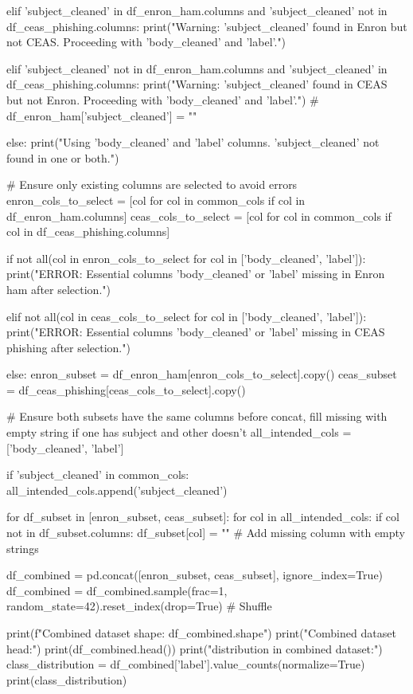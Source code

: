 \begin{ffcode}
    elif 'subject_cleaned' in df_enron_ham.columns and 'subject_cleaned' not in df_ceas_phishing.columns:
        print("Warning: 'subject_cleaned' found in Enron but not CEAS. Proceeding with 'body_cleaned' and 'label'.")

    elif 'subject_cleaned' not in df_enron_ham.columns and 'subject_cleaned' in df_ceas_phishing.columns:
        print("Warning: 'subject_cleaned' found in CEAS but not Enron. Proceeding with 'body_cleaned' and 'label'.")
        # df_enron_ham['subject_cleaned'] = ""

    else:
        print("Using 'body_cleaned' and 'label' columns. 'subject_cleaned' not found in one or both.")

    # Ensure only existing columns are selected to avoid errors
    enron_cols_to_select = [col for col in common_cols if col in df_enron_ham.columns]
    ceas_cols_to_select = [col for col in common_cols if col in df_ceas_phishing.columns]

    if not all(col in enron_cols_to_select for col in ['body_cleaned', 'label']):
            print("ERROR: Essential columns 'body_cleaned' or 'label' missing in Enron ham after selection.")

    elif not all(col in ceas_cols_to_select for col in ['body_cleaned', 'label']):
            print("ERROR: Essential columns 'body_cleaned' or 'label' missing in CEAS phishing after selection.")

    else:
        enron_subset = df_enron_ham[enron_cols_to_select].copy()
        ceas_subset = df_ceas_phishing[ceas_cols_to_select].copy()

        # Ensure both subsets have the same columns before concat, fill missing with empty string if one has subject and other doesn't
        all_intended_cols = ['body_cleaned', 'label']

        if 'subject_cleaned' in common_cols:
            all_intended_cols.append('subject_cleaned')

        for df_subset in [enron_subset, ceas_subset]:
            for col in all_intended_cols:
                if col not in df_subset.columns:
                    df_subset[col] = "" # Add missing column with empty strings


        df_combined = pd.concat([enron_subset, ceas_subset], ignore_index=True)
        df_combined = df_combined.sample(frac=1, random_state=42).reset_index(drop=True) # Shuffle

        print(f"Combined dataset shape: {df_combined.shape}")
        print("Combined dataset head:")
        print(df_combined.head())
        print("\nLabel distribution in combined dataset:")
        class_distribution = df_combined['label'].value_counts(normalize=True)
        print(class_distribution)


\end{ffcode}
